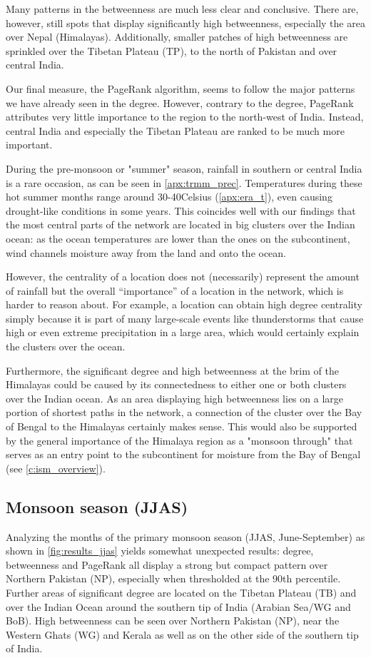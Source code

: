 Many patterns in the betweenness are much less clear and conclusive. There are, however, still spots that display significantly high betweenness, especially the area over Nepal (Himalayas). Additionally, smaller patches of high betweenness are sprinkled over the Tibetan Plateau (TP), to the north of Pakistan and over central India.

Our final measure, the PageRank algorithm, seems to follow the major patterns we have already seen in the degree. However, contrary to the degree, PageRank attributes very little importance to the region to the north-west of India. Instead, central India and especially the Tibetan Plateau are ranked to be much more important.

During the pre-monsoon or "summer" season, rainfall in southern or central India is a rare occasion, as can be seen in \cref{apx:trmm_prec}. Temperatures during these hot summer months range around 30-40\degree Celsius (\cref{apx:era_t}), even causing drought-like conditions in some years. This coincides well with our findings that the most central parts of the network are located in big clusters over the Indian ocean: as the ocean temperatures are lower than the ones on the subcontinent, wind channels moisture away from the land and onto the ocean.

However, the centrality of a location does not (necessarily) represent the amount of rainfall but the overall ``importance'' of a location in the network, which is harder to reason about. For example, a location can obtain high degree centrality simply because it is part of many large-scale events like thunderstorms that cause high or even extreme precipitation in a large area, which would certainly explain the clusters over the ocean.

Furthermore, the significant degree and high betweenness at the brim of the Himalayas could be caused by its connectedness to either one or both clusters over the Indian ocean. As an area displaying high betweenness lies on a large portion of shortest paths in the network, a connection of the cluster over the Bay of Bengal to the Himalayas certainly makes sense. This would also be supported by the general importance of the Himalaya region as a "monsoon through" that serves as an entry point to the subcontinent for moisture from the Bay of Bengal (see \cref{c:ism_overview}).

\subsection{Monsoon season (JJAS)}
Analyzing the months of the primary monsoon season (JJAS, June-September) as shown in \cref{fig:results_jjas} yields somewhat unexpected results: degree, betweenness and PageRank all display a strong but compact pattern over Northern Pakistan (NP), especially when thresholded at the 90th percentile. Further areas of significant degree are located on the Tibetan Plateau (TB) and over the Indian Ocean around the southern tip of India (Arabian Sea/WG and BoB). High betweenness can be seen over Northern Pakistan (NP), near the Western Ghats (WG) and Kerala as well as on the other side of the southern tip of India.

